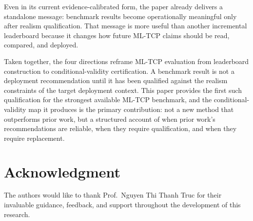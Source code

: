\documentclass[10pt,conference]{IEEEtran}
\begin{document}
Even in its current evidence-calibrated form, the paper already delivers a standalone message: benchmark results become operationally meaningful only after realism qualification. That message is more useful than another incremental leaderboard because it changes how future ML-TCP claims should be read, compared, and deployed.

Taken together, the four directions reframe ML-TCP evaluation from leaderboard construction to conditional-validity certification. A benchmark result is not a deployment recommendation until it has been qualified against the realism constraints of the target deployment context. This paper provides the first such qualification for the strongest available ML-TCP benchmark, and the conditional-validity map it produces is the primary contribution: not a new method that outperforms prior work, but a structured account of when prior work's recommendations are reliable, when they require qualification, and when they require replacement.

\section*{Acknowledgment}
The authors would like to thank Prof.\ Nguyen Thi Thanh Truc for their invaluable guidance, feedback, and support throughout the development of this research.

\balance
\end{document}
